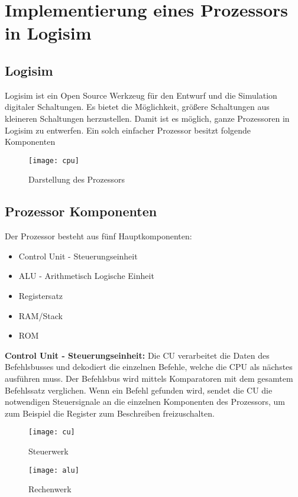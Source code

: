 \documentclass[12pt]{article}
\begin{document}
\newpage
\section{Implementierung eines Prozessors in Logisim}
\subsection{Logisim}
Logisim ist ein Open Source Werkzeug für den Entwurf und die Simulation digitaler Schaltungen. Es bietet die Möglichkeit, größere Schaltungen aus kleineren Schaltungen herzustellen. Damit ist es möglich, ganze Prozessoren in Logisim zu entwerfen. Ein solch einfacher Prozessor besitzt folgende Komponenten 

\begin{figure}[!htb]
\centering
\texttt{[image: cpu]}
\caption{Darstellung des Prozessors}
\centering
\label{fig:register}
\end{figure}
\newpage



\subsection{Prozessor Komponenten}
Der Prozessor besteht aus fünf Hauptkomponenten:
\begin{itemize}
\item Control Unit - Steuerungseinheit
\item ALU - Arithmetisch Logische Einheit
\item Registersatz 
\item RAM/Stack
\item ROM
\end{itemize}

\textbf{Control Unit - Steuerungseinheit: } Die CU verarbeitet die Daten des Befehlsbusses und dekodiert die einzelnen Befehle, welche die CPU als nächstes ausführen muss. Der Befehlsbus wird mittels Komparatoren mit dem gesamtem Befehlssatz verglichen. Wenn ein Befehl gefunden wird, sendet die CU die notwendigen Steuersignale an die einzelnen Komponenten des Prozessors, um zum Beispiel die Register zum Beschreiben freizuschalten.


\begin{figure}[!htbp]
\texttt{[image: cu]}
\centering
\label{fig:cu}
\caption{Steuerwerk}
\end{figure}
\newpage
\newpage


\begin{figure}[!htbp]
\texttt{[image: alu]}
\centering
\label{fig:alu}
\caption{Rechenwerk}
\end{figure}
\end{document}

